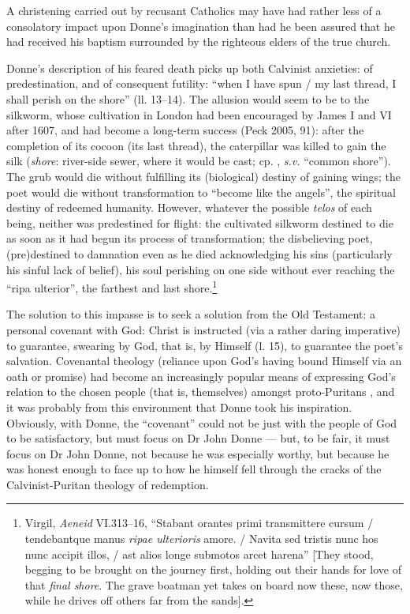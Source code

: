 \begin{paper}
\noindent A christening carried out by recusant Catholics may have had rather less
of a consolatory impact upon Donne's imagination than had he been
assured that he had received his baptism surrounded by the righteous
elders of the true church.

Donne's description of his feared death picks up both Calvinist
anxieties: of predestination, and of consequent futility: ``when I have
spun / my last thread, I shall perish on the shore'' (ll. 13--14). The
allusion would seem to be to the silkworm, whose cultivation in London
had been encouraged by James I and VI after 1607, and had become a
long-term success (Peck 2005, 91): after the completion of its cocoon
(its last thread), the caterpillar was killed to gain the silk
(\emph{shore}: river-side sewer, where it would be cast; cp. \citealt[387]{williams_dictionary_1994}, \emph{s.v.} ``common shore''). The grub would die without
fulfilling its (biological) destiny of gaining wings; the poet would die
without transformation to ``become like the angels'', the spiritual
destiny of redeemed humanity. However, whatever the possible
\emph{telos} of each being, neither was predestined for flight: the
cultivated silkworm destined to die as soon as it had begun its process
of transformation; the disbelieving poet, (pre)destined to damnation
even as he died acknowledging his sins (particularly his sinful lack of
belief), his soul perishing on one side without ever reaching the ``ripa
ulterior'', the farthest and last shore.\footnote{Virgil, \emph{Aeneid}
  VI.313--16, ``Stabant orantes primi transmittere cursum / tendebantque
  manus \emph{ripae ulterioris} amore. / Navita sed tristis nunc hos nunc
  accipit illos, / ast alios longe submotos arcet harena'' [They stood,
  begging to be brought on the journey first, holding out their hands
  for love of that \emph{final shore}. The grave boatman yet takes on
  board now these, now those, while he drives off others far from the
  sands].}

The solution to this impasse is to seek a solution from the Old
Testament: a personal covenant with God: Christ is instructed (via a
rather daring imperative) to guarantee, swearing by God, that is, by
Himself (l. 15), to guarantee the poet's salvation. Covenantal theology
(reliance upon God's having bound Himself via an oath or promise) had
become an increasingly popular means of expressing God's relation to the
chosen people (that is, themselves) amongst  proto-Puritans \citep{holifield_covenant_1974,von_rohr_covenant_2002}, and it was probably from this environment that
Donne took his inspiration. Obviously, with Donne, the ``covenant''
could not be just with the people of God to be satisfactory, but must
focus on Dr John Donne --- but, to be fair, it must focus on Dr John
Donne, not because he was especially worthy, but because he was honest
enough to face up to how he himself fell through the cracks of the
Calvinist-Puritan theology of redemption.


\end{paper}

